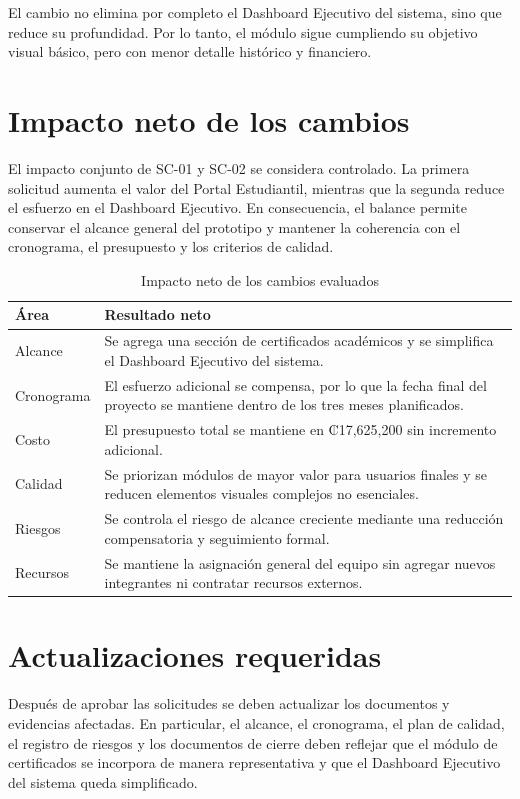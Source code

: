 \documentclass[11pt,spanish]{article}
\begin{document}
El cambio no elimina por completo el Dashboard Ejecutivo del sistema, sino que reduce su profundidad. Por lo tanto, el módulo sigue cumpliendo su objetivo visual básico, pero con menor detalle histórico y financiero.

\section{Impacto neto de los cambios}

El impacto conjunto de SC-01 y SC-02 se considera controlado. La primera solicitud aumenta el valor del Portal Estudiantil, mientras que la segunda reduce el esfuerzo en el Dashboard Ejecutivo. En consecuencia, el balance permite conservar el alcance general del prototipo y mantener la coherencia con el cronograma, el presupuesto y los criterios de calidad.

\begin{table}[H]
\centering
\caption{Impacto neto de los cambios evaluados}
\label{tab:impacto-neto}
{\small
\begin{tabularx}{\textwidth}{p{3.5cm} Y}
\toprule
\textbf{Área} & \textbf{Resultado neto} \\
\midrule
Alcance & Se agrega una sección de certificados académicos y se simplifica el Dashboard Ejecutivo del sistema. \\
Cronograma & El esfuerzo adicional se compensa, por lo que la fecha final del proyecto se mantiene dentro de los tres meses planificados. \\
Costo & El presupuesto total se mantiene en ₡17,625,200 sin incremento adicional. \\
Calidad & Se priorizan módulos de mayor valor para usuarios finales y se reducen elementos visuales complejos no esenciales. \\
Riesgos & Se controla el riesgo de alcance creciente mediante una reducción compensatoria y seguimiento formal. \\
Recursos & Se mantiene la asignación general del equipo sin agregar nuevos integrantes ni contratar recursos externos. \\
\bottomrule
\end{tabularx}
}
\end{table}

\section{Actualizaciones requeridas}

Después de aprobar las solicitudes se deben actualizar los documentos y evidencias afectadas. En particular, el alcance, el cronograma, el plan de calidad, el registro de riesgos y los documentos de cierre deben reflejar que el módulo de certificados se incorpora de manera representativa y que el Dashboard Ejecutivo del sistema queda simplificado.
\end{document}
